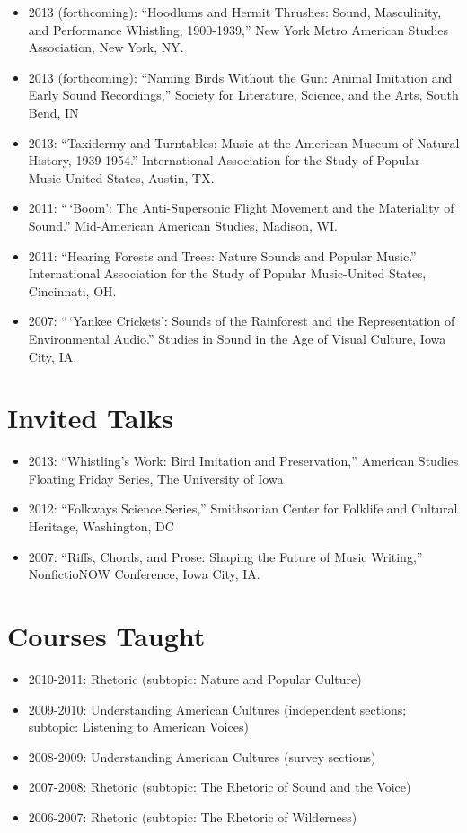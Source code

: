 \documentclass[11pt, a4paper]{article}
\begin{document}
\begin{itemize}
\itemsep1pt\parskip0pt
\item
  2013 (forthcoming): ``Hoodlums and Hermit Thrushes: Sound,
  Masculinity, and Performance Whistling, 1900-1939,'' New York Metro
  American Studies Association, New York, NY.
\item
  2013 (forthcoming): ``Naming Birds Without the Gun: Animal Imitation
  and Early Sound Recordings,'' Society for Literature, Science, and the
  Arts, South Bend, IN
\item
  2013: ``Taxidermy and Turntables: Music at the American Museum of
  Natural History, 1939-1954.'' International Association for the Study
  of Popular Music-United States, Austin, TX.
\item
  2011: ``\,`Boom': The Anti-Supersonic Flight Movement and the
  Materiality of Sound.'' Mid-American American Studies, Madison, WI.
\item
  2011: ``Hearing Forests and Trees: Nature Sounds and Popular Music.''
  International Association for the Study of Popular Music-United
  States, Cincinnati, OH.
\item
  2007: ``\,`Yankee Crickets': Sounds of the Rainforest and the
  Representation of Environmental Audio.'' Studies in Sound in the Age
  of Visual Culture, Iowa City, IA.
\end{itemize}

\section{Invited Talks}

\begin{itemize}
\itemsep1pt\parskip0pt
\item
  2013: ``Whistling's Work: Bird Imitation and Preservation,'' American
  Studies Floating Friday Series, The University of Iowa
\item
  2012: ``Folkways Science Series,'' Smithsonian Center for Folklife and
  Cultural Heritage, Washington, DC
\item
  2007: ``Riffs, Chords, and Prose: Shaping the Future of Music
  Writing,'' NonfictioNOW Conference, Iowa City, IA.
\end{itemize}

\section{Courses Taught}

\begin{itemize}
\itemsep1pt\parskip0pt
\item
  2010-2011: Rhetoric (subtopic: Nature and Popular Culture)
\item
  2009-2010: Understanding American Cultures (independent sections;
  subtopic: Listening to American Voices)
\item
  2008-2009: Understanding American Cultures (survey sections)
\item
  2007-2008: Rhetoric (subtopic: The Rhetoric of Sound and the Voice)
\item
  2006-2007: Rhetoric (subtopic: The Rhetoric of Wilderness)
\end{itemize}
\end{document}
